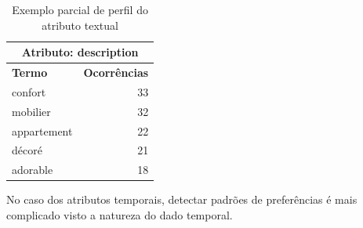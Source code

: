 \begin{table}[!h]
	\centering
	\begin{tabular}{|l|r|}
	\hline
	\multicolumn{2}{|c|}{\textbf{Atributo: description}} \\ \hline
	\textbf{Termo}     & \textbf{Ocorrências}     \\ \hline
	confort             & 33                       \\ \hline
	mobilier            & 32                       \\ \hline
	appartement             & 22                       \\ \hline
	décoré               & 21                       \\ \hline
	adorable               & 18                       \\ \hline
	\end{tabular}
	\caption{Exemplo parcial de perfil do atributo textual}
	\label{table:perfil-textual-2}
\end{table}

No caso dos atributos temporais, detectar padrões de preferências é mais complicado visto a natureza do dado temporal.